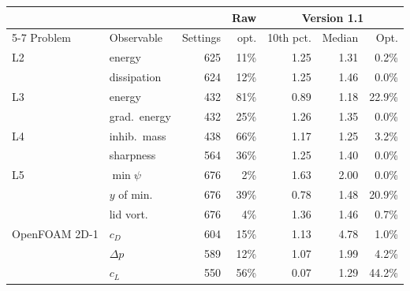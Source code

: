 \begin{tabular}{llrrrrr}
\toprule
& & & Raw & \multicolumn{3}{c}{Version 1.1} \\
\cmidrule(lr){5-7}
Problem & Observable & Settings & opt. & 10th pct. & Median & Opt. \\
\midrule
L2 & energy & 625 & 11\% & 1.25 & 1.31 & 0.2\% \\
 & dissipation & 624 & 12\% & 1.25 & 1.46 & 0.0\% \\
L3 & energy & 432 & 81\% & 0.89 & 1.18 & 22.9\% \\
 & grad.\ energy & 432 & 25\% & 1.26 & 1.35 & 0.0\% \\
L4 & inhib.\ mass & 438 & 66\% & 1.17 & 1.25 & 3.2\% \\
 & sharpness & 564 & 36\% & 1.25 & 1.40 & 0.0\% \\
L5 & $\min\psi$ & 676 & 2\% & 1.63 & 2.00 & 0.0\% \\
 & $y$ of min. & 676 & 39\% & 0.78 & 1.48 & 20.9\% \\
 & lid vort. & 676 & 4\% & 1.36 & 1.46 & 0.7\% \\
OpenFOAM 2D-1 & $c_D$ & 604 & 15\% & 1.13 & 4.78 & 1.0\% \\
 & $\Delta p$ & 589 & 12\% & 1.07 & 1.99 & 4.2\% \\
 & $c_L$ & 550 & 56\% & 0.07 & 1.29 & 44.2\% \\
\bottomrule
\end{tabular}
